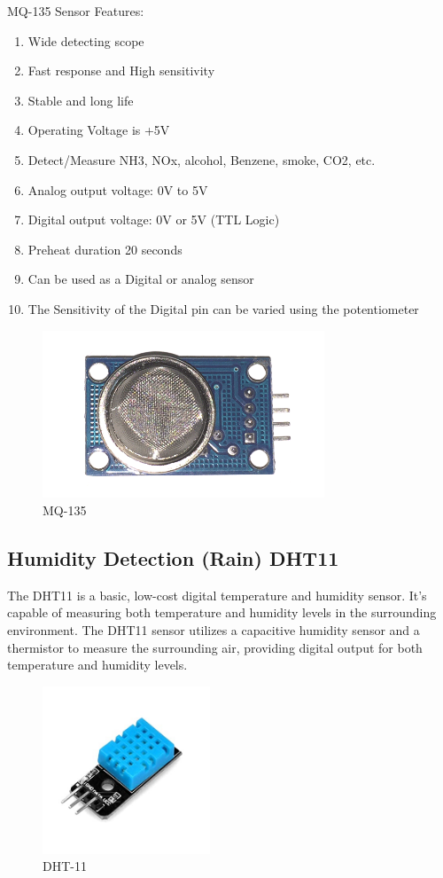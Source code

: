 \documentclass[conference]{IEEEtran}
\begin{document}
MQ-135 Sensor Features:

\begin{enumerate}
    \item Wide detecting scope
    \item Fast response and High sensitivity
    \item Stable and long life
    \item Operating Voltage is +5V
    \item Detect/Measure NH3, NOx, alcohol, Benzene, smoke, CO2, etc.
    \item Analog output voltage: 0V to 5V
    \item Digital output voltage: 0V or 5V (TTL Logic)
    \item Preheat duration 20 seconds
    \item Can be used as a Digital or analog sensor
    \item The Sensitivity of the Digital pin can be varied using the potentiometer
    
\end{enumerate}
\begin{figure}[th]
    \centering
    \includegraphics[height=5cm,width=\linewidth]{images/MQ-135-Sensor.png}
    \caption{MQ-135}
    \label{fig:enter-label}
\end{figure}

\subsection{Humidity Detection (Rain) DHT11}

The DHT11 is a basic, low-cost digital temperature and humidity sensor. It's capable of measuring both temperature and humidity levels in the surrounding environment. The DHT11 sensor utilizes a capacitive humidity sensor and a thermistor to measure the surrounding air, providing digital output for both temperature and humidity levels.
\begin{figure}[th]
    \centering
    \includegraphics[height=5cm,width=\linewidth]{images/dh11.jpg}
    \caption{DHT-11}
    \label{fig:enter-label}
\end{figure}
\end{document}
